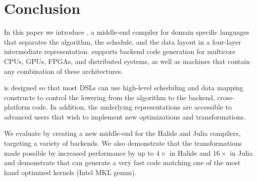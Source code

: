 
\section{Conclusion}

In this paper we introduce \framework, a middle-end compiler for domain specific languages that separates the algorithm, the schedule, and the data layout in a four-layer intermediate representation.  \framework supports backend code generation for multicore CPUs, GPUs, FPGAs, and distributed systems, as well as machines that contain any combination of these architectures.

\framework is designed so that most DSLs can use high-level scheduling and data mapping constructs to control the lowering from the algorithm to the backend, cross-platform code.  In addition, the underlying representations are accessible to advanced users that wish to implement new optimizations and transformations.

We evaluate \framework by creating a new middle-end for the Halide and Julia compilers, targeting a variety of backends.  We also demonstrate that the transformations made possible by \framework increased performance by up to $4\times$ in Halide and $16\times$ in Julia and demonstrate that \framework{} can generate a very fast code matching one of the most hand optimized kernels (Intel MKL gemm).

\newpage